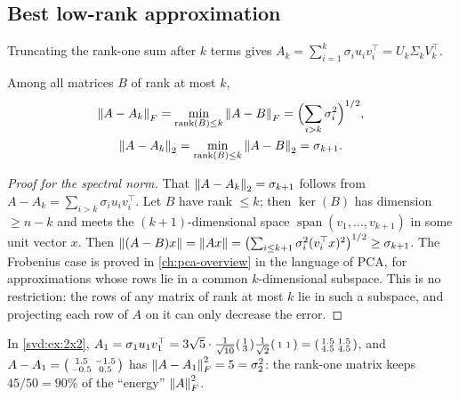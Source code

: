 \begin{notechapter}
\section{Best low-rank approximation}\label{svd:sec:eckart-young}

Truncating the rank-one sum after $k$ terms gives
$A_k = \sum_{i=1}^k\sigma_iu_iv_i^\top = U_k\Sigma_kV_k^\top$.

\begin{theorem}\label{svd:thm:eckart-young}
Among all matrices $B$ of rank at most $k$,
\begin{gather*}
  \left\|A - A_k\right\|_F = \min_{\mathrm{rank}(B)\leq k}\left\|A - B\right\|_F = \Bigl(\sum_{i>k}\sigma_i^2\Bigr)^{1/2},
  \\
  \left\|A - A_k\right\|_2 = \min_{\mathrm{rank}(B)\leq k}\left\|A - B\right\|_2 = \sigma_{k+1}.
\end{gather*}
\end{theorem}

\begin{proof}[Proof for the spectral norm]
That $\left\|A - A_k\right\|_2 = \sigma_{k+1}$ follows from $A - A_k = \sum_{i>k}\sigma_iu_iv_i^\top$.
Let $B$ have rank $\leq k$; then $\ker(B)$ has dimension $\geq n-k$ and meets the
$(k+1)$-dimensional space $\operatorname{span}(v_1,\dots,v_{k+1})$ in some unit vector $x$.
Then $\left\|(A-B)x\right\| = \left\|Ax\right\| = \bigl(\sum_{i\leq k+1}\sigma_i^2(v_i^\top x)^2\bigr)^{1/2}\geq\sigma_{k+1}$.
The Frobenius case is proved in \cref{ch:pca-overview} in the language of PCA, for
approximations whose rows lie in a common $k$-dimensional subspace. This is no restriction:
the rows of any matrix of rank at most $k$ lie in such a subspace, and projecting each row of
$A$ on it can only decrease the error.
\end{proof}

\begin{example}
In \cref{svd:ex:2x2},
$A_1 = \sigma_1u_1v_1^\top = 3\sqrt5\cdot\frac1{\sqrt{10}}\begin{psmallmatrix}1\\3\end{psmallmatrix}\frac1{\sqrt2}\begin{psmallmatrix}1&1\end{psmallmatrix} = \begin{psmallmatrix}1.5&1.5\\4.5&4.5\end{psmallmatrix}$,
and $A - A_1 = \begin{psmallmatrix}1.5&-1.5\\-0.5&0.5\end{psmallmatrix}$ has
$\left\|A - A_1\right\|_F^2 = 5 = \sigma_2^2$: the rank-one matrix keeps $45/50 = 90\%$ of the
``energy'' $\left\|A\right\|_F^2$.
\end{example}


\end{notechapter}
